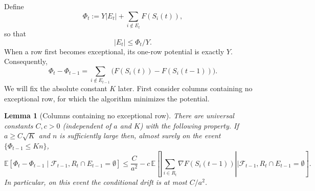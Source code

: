 \documentclass[reqno,english]{amsart}
\newcommand*{\EE}{\mathbb E}
\newcommand*{\calF}{\mathcal F}
\newtheorem{lemma}[lemma]{Lemma}
\theoremstyle{definition}
\begin{document}
Define
\begin{equation}\label{eq:Phi-def}
    \Phi_t:=Y|E_t|+\sum_{i\notin E_t}F(S_i(t)),
\end{equation}
so that
\begin{equation}\label{eq:E-by-Phi}
    |E_t|\le\Phi_t/Y.
\end{equation}
When a row first becomes exceptional, its one-row potential is exactly $Y$.
Consequently,
\begin{equation}\label{eq:Phi-increment}
 \Phi_t-\Phi_{t-1}
 =\sum_{i\notin E_{t-1}}
    \big(F(S_i(t))-F(S_i(t-1))\big).
\end{equation}
{
We will fix the absolute constant $K$ later. First consider columns
containing no exceptional row, for which the algorithm minimizes the potential.
}

\begin{lemma}[Columns containing no exceptional row]\label{lem:no-exceptional}
There are universal constants $C,c>0$ (independent of $a$ and $K$) with the following property.
If $a\ge C\sqrt K$ and $n$ is sufficiently large then, almost surely on the event
$\{\Phi_{t-1}\le Kn\}$,
\begin{equation}\label{eq:no-exceptional-drift}
 \EE[\Phi_t-\Phi_{t-1}\mid
      \calF_{t-1},R_t\cap E_{t-1}=\emptyset]
 \le\frac{C}{a^2}
 -c\,\EE\left[
   \left|\sum_{i\in R_t}\nabla F(S_i(t-1))\right|
   \mathrel{\Big|}\calF_{t-1},R_t\cap E_{t-1}=\emptyset
 \right].
\end{equation}
In particular, on this event the conditional drift is at most $C/a^2$.
\end{lemma}
\end{document}
